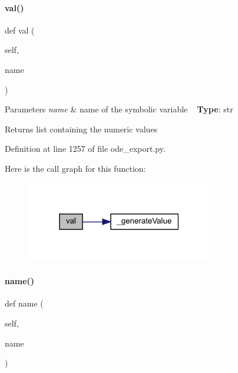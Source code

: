 \paragraph{\texorpdfstring{val()}{val()}}
{\footnotesize\ttfamily def val (\begin{DoxyParamCaption}\item[{}]{self,  }\item[{}]{name }\end{DoxyParamCaption})}


\begin{DoxyParams}{Parameters}
{\em name} & name of the symbolic variable ~\newline
{\bfseries{Type}}\+: str\\
\hline
\end{DoxyParams}
\begin{DoxyReturn}{Returns}
list containing the numeric values 
\end{DoxyReturn}


Definition at line 1257 of file ode\+\_\+export.\+py.

Here is the call graph for this function\+:
\nopagebreak
\begin{figure}[H]
\begin{center}
\leavevmode
\includegraphics[width=231pt]{classamici_1_1ode__export_1_1_o_d_e_model_a8d081fd7c43cbb2bce7b4eca67fb94c5_cgraph}
\end{center}
\end{figure}
\mbox{\label{classamici_1_1ode__export_1_1_o_d_e_model_a4d110acf8e52c4d48044071ea06952c0}} 
\paragraph{\texorpdfstring{name()}{name()}}
{\footnotesize\ttfamily def name (\begin{DoxyParamCaption}\item[{}]{self,  }\item[{}]{name }\end{DoxyParamCaption})}


